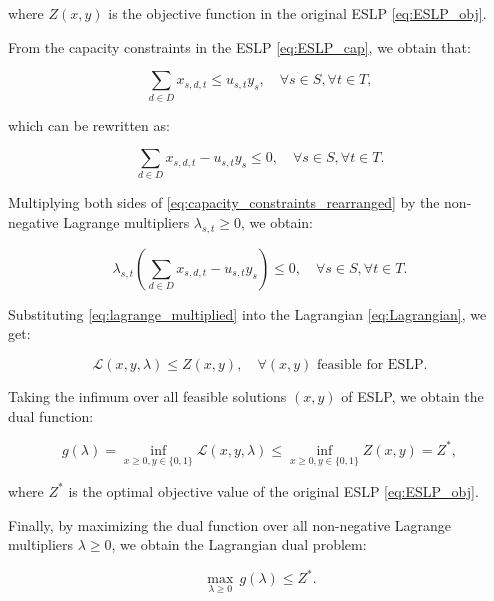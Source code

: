 where $Z(x,y)$ is the objective function in the original ESLP \eqref{eq:ESLP_obj}.

From the capacity constraints in the ESLP \eqref{eq:ESLP_cap}, we obtain that:

\begin{equation}\label{eq:capacity_constraints}
    \sum_{d \in D} x_{s,d,t} \leq u_{s,t} y_s, \quad \forall s \in S, \forall t \in T,
\end{equation}

which can be rewritten as:

\begin{equation}\label{eq:capacity_constraints_rearranged}
    \sum_{d \in D} x_{s,d,t} - u_{s,t} y_s \leq 0, \quad \forall s \in S, \forall t \in T.
\end{equation}

Multiplying both sides of \eqref{eq:capacity_constraints_rearranged} by the non-negative Lagrange multipliers $\lambda_{s,t} \geq 0$, we obtain:

\begin{equation}\label{eq:lagrange_multiplied}
    \lambda_{s,t} \left( \sum_{d \in D} x_{s,d,t} - u_{s,t} y_s \right) \leq 0, \quad \forall s \in S, \forall t \in T.
\end{equation}

Substituting \eqref{eq:lagrange_multiplied} into the Lagrangian \eqref{eq:Lagrangian}, we get:

\begin{equation}\label{eq:Lagrangian_bound}
    \mathcal{L}(x,y,\lambda) \leq Z(x,y), \quad \forall (x,y) \text{ feasible for ESLP}.
\end{equation}

Taking the infimum over all feasible solutions $(x,y)$ of ESLP, we obtain the dual function:

\begin{equation}\label{eq:dual_function}
    g(\lambda) = \inf_{x \geq 0, y \in \{0,1\}} \mathcal{L}(x,y,\lambda) \leq \inf_{x \geq 0, y \in \{0,1\}} Z(x,y) = Z^*,
\end{equation}

where $Z^*$ is the optimal objective value of the original ESLP \eqref{eq:ESLP_obj}.

Finally, by maximizing the dual function over all non-negative Lagrange multipliers $\lambda \geq 0$, we obtain the Lagrangian dual problem:

\begin{equation}\label{eq:dual_problem}
    \max_{\lambda \geq 0} \, g(\lambda) \leq Z^*.
\end{equation}

